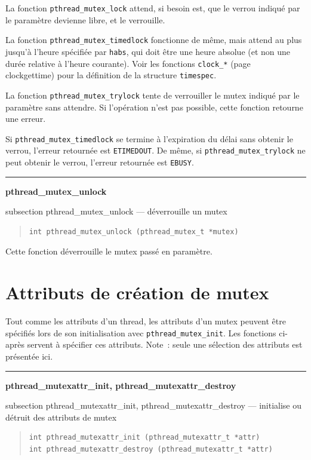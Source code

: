 \documentclass [twoside] {report}
\newcommand {\primitive} [1]
    {
	\phantomsection
	{\large \textbf {#1}}
	\addcontentsline {toc} {subsection} {#1}
    }
\newcommand {\separation}
    {
	\vspace {5mm}
	\nopagebreak
	\hrule
    }
\begin{document}
La fonction \verb|pthread_mutex_lock| attend, si besoin est, que le
verrou indiqué par le paramètre devienne libre, et le verrouille.

La fonction \verb|pthread_mutex_timedlock| fonctionne de même, mais
attend au plus jusqu'à l'heure spécifiée par \texttt {habs}, qui
doit être une heure absolue (et non une durée relative à l'heure
courante). Voir les fonctions \texttt {clock\_*} (page~\pageref
{clockgettime}) pour la définition de la structure \texttt {timespec}.

La fonction \verb|pthread_mutex_trylock| tente de verrouiller le mutex
indiqué par le paramètre sans attendre. Si l'opération n'est pas
possible, cette fonction retourne une erreur.

Si \verb|pthread_mutex_timedlock| se termine à l'expiration du délai
sans obtenir le verrou, l'erreur retournée est \texttt {ETIMEDOUT}.
De même, si \verb|pthread_mutex_trylock| ne peut obtenir le verrou,
l'erreur retournée est \texttt {EBUSY}.


\separation
\primitive {pthread\_mutex\_unlock} --- déverrouille un mutex

\begin {quote}
\begin {verbatim}
int pthread_mutex_unlock (pthread_mutex_t *mutex)
\end{verbatim}
\end {quote}

Cette fonction déverrouille le mutex passé en paramètre.


\section {Attributs de création de mutex}

Tout comme les attributs d'un thread, les attributs d'un
mutex peuvent être spécifiés lors de son initialisation avec
\verb|pthread_mutex_init|. Les fonctions ci-après servent à spécifier
ces attributs.
Note~: seule une sélection des attributs est présentée ici.

\separation
\primitive {pthread\_mutexattr\_init, pthread\_mutexattr\_destroy} ---
initialise ou détruit des attributs de mutex

\begin {quote}
\begin {verbatim}
int pthread_mutexattr_init (pthread_mutexattr_t *attr)
int pthread_mutexattr_destroy (pthread_mutexattr_t *attr)
\end{verbatim}
\end {quote}
\end{document}
